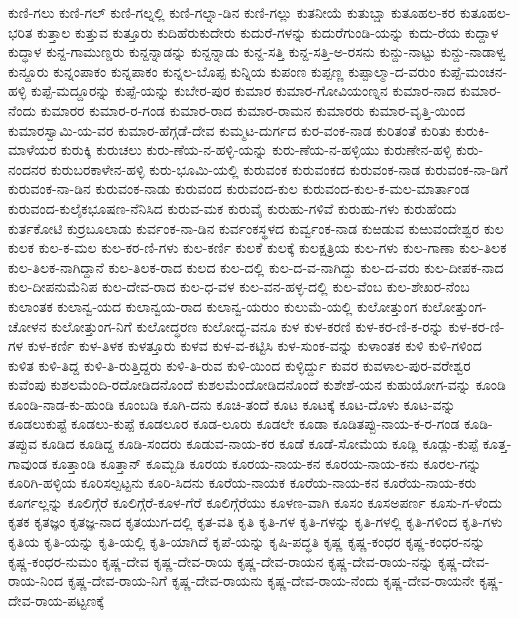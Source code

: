 {ಕುಣಿ-ಗಲು
ಕುಣಿ-ಗಲ್
ಕುಣಿ-ಗಲ್ನಲ್ಲಿ
ಕುಣಿ-ಗಲ್ನಾ-ಡಿನ
ಕುಣಿ-ಗಲ್ಲು
ಕುತನೀಯೆ
ಕುತುಬ್ಷಾ
ಕುತೂಹಲ-ಕರ
ಕುತೂಹಲ-ಭರಿತ
ಕುತ್ತಾಲ
ಕುತ್ತುವ
ಕುತ್ತೂರು
ಕುದಿಹೆರುಕುದೇರು
ಕುದುರೆ-ಗಳನ್ನು
ಕುದುರೆಗುಂಡಿ-ಯನ್ನು
ಕುದು-ರೆಯ
ಕುದ್ದಾಳ
ಕುದ್ಧಾಳ
ಕುನ್ದ-ಗಾಮುಣ್ಡರು
ಕುನ್ದನ್ನಾಡನ್ನು
ಕುನ್ದನ್ನಾಡು
ಕುನ್ದ-ಸತ್ತಿ
ಕುನ್ದ-ಸತ್ತಿ-ಅ-ರಸನು
ಕುನ್ದು-ನಾಟ್ಟು
ಕುನ್ದು-ನಾಡಾಳ್ವ
ಕುನ್ದೂರು
ಕುನ್ನಂಪಾಕಂ
ಕುನ್ನಪಾಕಂ
ಕುನ್ನಲ-ಬೊಪ್ಪ
ಕುನ್ನಿಯ
ಕುಪಂಣ
ಕುಪ್ಪಣ್ಣ
ಕುಪ್ಪಾಲ್ಮಾ-ದ-ವರುಂ
ಕುಪ್ಪೆ-ಮಂಚನ-ಹಳ್ಳಿ
ಕುಪ್ಪೆ-ಮದ್ದೂರನ್ನು
ಕುಪ್ಪೆ-ಯನ್ನು
ಕುಬೇರ-ಪುರ
ಕುಮಾರ
ಕುಮಾರ-ಗೋವಿಯಂಣ್ನನ
ಕುಮಾರ-ನಾದ
ಕುಮಾರ-ನೆಂದು
ಕುಮಾರರ
ಕುಮಾರ-ರ-ಗಂಡ
ಕುಮಾರ-ರಾದ
ಕುಮಾರ-ರಾಮನ
ಕುಮಾರರು
ಕುಮಾರ-ವೃತ್ತಿ-ಯಿಂದ
ಕುಮಾರಸ್ವಾಮಿ-ಯ-ವರ
ಕುಮಾರ-ಹೆಗ್ಗಡೆ-ದೇವ
ಕುಮ್ಮಟ-ದುರ್ಗದ
ಕುರ-ವಂಕ-ನಾಡ
ಕುರಿತಂತೆ
ಕುರಿತು
ಕುರುಕಿ-ಮಾಳೆಯರ
ಕುರುಕ್ಕಿ
ಕುರುಚಲು
ಕುರು-ಣೆಯ-ನ-ಹಳ್ಳಿ-ಯನ್ನು
ಕುರು-ಣೆಯ-ನ-ಹಳ್ಳಿಯು
ಕುರುಣೇನ-ಹಳ್ಳಿ
ಕುರು-ನಂದನರ
ಕುರುಬರಕಾಳೇನ-ಹಳ್ಳಿ
ಕುರು-ಭೂಮಿ-ಯಲ್ಲಿ
ಕುರುವಂಕ
ಕುರುವಂಕದ
ಕುರುವಂಕ-ನಾಡ
ಕುರುವಂಕ-ನಾ-ಡಿಗೆ
ಕುರುವಂಕ-ನಾ-ಡಿನ
ಕುರುವಂಕ-ನಾಡು
ಕುರುವಂದ
ಕುರುವಂದ-ಕುಲ
ಕುರುವಂದ-ಕುಲ-ಕ-ಮಲ-ಮಾರ್ತಾಂಡ
ಕುರುವಂದ-ಕುಲೈಕಭೂಷಣ-ನೆನಿಸಿದ
ಕುರುವ-ಮಕ
ಕುರುವೈ
ಕುರುಹು-ಗಳಿವೆ
ಕುರುಹು-ಗಳು
ಕುರುಹೆಂದು
ಕುರ್ತಕೋಟಿ
ಕುರ್ರಬೂಲಾಡು
ಕುರ್ವಂಕ-ನಾ-ಡಿನ
ಕುರ್ವಂಕಸ್ಥಳದ
ಕುರ್ವ್ವಂಕ-ನಾಡ
ಕುಱಡುವ
ಕುಱುವಂದೇಶ್ವರ
ಕುಲ
ಕುಲಕ
ಕುಲ-ಕ-ಮಲ
ಕುಲ-ಕರ-ಣಿ-ಗಳು
ಕುಲ-ಕರ್ಣಿ
ಕುಲಕೆ
ಕುಲಕ್ಕೆ
ಕುಲಕ್ಷತ್ರಿಯ
ಕುಲ-ಗಳು
ಕುಲ-ಗಾಣಾ
ಕುಲ-ತಿಲಕ
ಕುಲ-ತಿಲಕ-ನಾಗಿದ್ದಾನೆ
ಕುಲ-ತಿಲಕ-ರಾದ
ಕುಲದ
ಕುಲ-ದಲ್ಲಿ
ಕುಲ-ದ-ವ-ನಾಗಿದ್ದು
ಕುಲ-ದ-ವರು
ಕುಲ-ದೀಪಕ-ನಾದ
ಕುಲ-ದೀಪನುಮೆನಿಪ
ಕುಲ-ದೇವ-ರಾದ
ಕುಲ-ಧ-ವಳ
ಕುಲ-ವನ-ಹಳ್ಳ-ದಲ್ಲಿ
ಕುಲ-ವೆಂಬ
ಕುಲ-ಶೇಖರ-ನೆಂಬ
ಕುಲಾಂತಕ
ಕುಲಾನ್ವ-ಯದ
ಕುಲಾನ್ವಯ-ರಾದ
ಕುಲಾನ್ವ-ಯರುಂ
ಕುಲುಮೆ-ಯಲ್ಲಿ
ಕುಲೋತ್ತುಂಗ
ಕುಲೋತ್ತುಂಗ-ಚೋಳನ
ಕುಲೋತ್ತುಂಗ-ನಿಗೆ
ಕುಲೋದ್ಧರಣ
ಕುಲೋದ್ಭ-ವನೂ
ಕುಳ
ಕುಳ-ಕರಣಿ
ಕುಳ-ಕರ-ಣಿ-ಕ-ರನ್ನು
ಕುಳ-ಕರ-ಣಿ-ಗಳ
ಕುಳ-ಕರ್ಣಿ
ಕುಳ-ತಿಳಕ
ಕುಳತ್ತೂರು
ಕುಳವ
ಕುಳ-ವ-ಕಟ್ಟಿಸಿ
ಕುಳ-ಸುಂಕ-ವನ್ನು
ಕುಳಾಂತಕ
ಕುಳಿ
ಕುಳಿ-ಗಳಿಂದ
ಕುಳಿತ
ಕುಳಿ-ತಿದ್ದ
ಕುಳಿ-ತಿ-ರುತ್ತಿದ್ದರು
ಕುಳಿ-ತಿ-ರುವ
ಕುಳಿ-ಯಿಂದ
ಕುಳ್ಳಿರ್ದ್ದು
ಕುವರ
ಕುವಳಾಲ-ಪುರ-ವರೇಶ್ವರ
ಕುವೆಂಪು
ಕುಶಲಮೆಂದಿ-ರದೋಡಿದನೊಂದೆ
ಕುಶಲಮೆಂದೋಡಿದನೊಂದೆ
ಕುಶೇಶೆ-ಯನ
ಕುಹುಯೋಗ-ವನ್ನು
ಕೂಂಡಿ
ಕೂಂಡಿ-ನಾಡ-ಕು-ಹುಂಡಿ
ಕೂಂಬಡಿ
ಕೂಗಿ-ದನು
ಕೂಚಿ-ತಂದೆ
ಕೂಟ
ಕೂಟಕ್ಕೆ
ಕೂಟ-ದೊಳು
ಕೂಟ-ವನ್ನು
ಕೂಡಲುಕುಪ್ಟೆ
ಕೂಡಲು-ಕುಪ್ಪೆ
ಕೂಡಲೂರ
ಕೂಡ-ಲೂರು
ಕೂಡಲೇ
ಕೂಡಾ
ಕೂಡಿತಪ್ಪು-ನಾಯ-ಕ-ರ-ಗಂಡ
ಕೂಡಿ-ತಪ್ಪುವ
ಕೂಡಿದ
ಕೂಡಿದ್ದ
ಕೂಡಿ-ಸಂದರು
ಕೂಡುವ-ನಾಯ-ಕರ
ಕೂಡೆ
ಕೂಡೆ-ಸೋಮೆಯ
ಕೂಡ್ಲಿ
ಕೂಡ್ಲು-ಕುಪ್ಪೆ
ಕೂತ್ತ-ಗಾವುಂಡ
ಕೂತ್ತಾಂಡಿ
ಕೂತ್ತಾನ್
ಕೂಮ್ಬಡಿ
ಕೂರಯ
ಕೂರಯ-ನಾಯ-ಕನ
ಕೂರಯ-ನಾಯ-ಕನು
ಕೂರಲ-ಗನ್ನು
ಕೂರಿಗಿ-ಹಳ್ಳಿಯ
ಕೂರಿಸಲ್ಪಟ್ಟನು
ಕೂರಿ-ಸಿದನು
ಕೂರೆಯ-ನಾಯಕ
ಕೂರೆಯ-ನಾಯ-ಕನ
ಕೂರೆಯ-ನಾಯ-ಕರು
ಕೂರ್ಗಲ್ಲನ್ನು
ಕೂಲಿಗ್ಗೆರೆ
ಕೂಲಿಗ್ಗೆರೆ-ಕೂಳ-ಗೆರೆ
ಕೂಲಿಗ್ಗೆರೆಯು
ಕೂಳಣ-ವಾಗಿ
ಕೂಸಂ
ಕೂಸಅಪರ್ಣ
ಕೂಸು-ಗ-ಳೆಂದು
ಕೃತಕ
ಕೃತಜ್ಞಂ
ಕೃತಜ್ಞ-ನಾದ
ಕೃತಯುಗ-ದಲ್ಲಿ
ಕೃತ-ವತಿ
ಕೃತಿ
ಕೃತಿ-ಗಳ
ಕೃತಿ-ಗಳನ್ನು
ಕೃತಿ-ಗಳಲ್ಲಿ
ಕೃತಿ-ಗಳಿಂದ
ಕೃತಿ-ಗಳು
ಕೃತಿಯ
ಕೃತಿ-ಯನ್ನು
ಕೃತಿ-ಯಲ್ಲಿ
ಕೃತಿ-ಯಾಗಿದೆ
ಕೃಪೆ-ಯನ್ನು
ಕೃಷಿ-ಪದ್ಧತಿ
ಕೃಷ್ಣ
ಕೃಷ್ಣ-ಕಂಧರ
ಕೃಷ್ಣ-ಕಂಧರ-ನನ್ನು
ಕೃಷ್ಣ-ಕಂಧರ-ನುಮಂ
ಕೃಷ್ಣ-ದೇವ
ಕೃಷ್ಣ-ದೇವ-ರಾಯ
ಕೃಷ್ಣ-ದೇವ-ರಾಯನ
ಕೃಷ್ಣ-ದೇವ-ರಾಯ-ನನ್ನು
ಕೃಷ್ಣ-ದೇವ-ರಾಯ-ನಿಂದ
ಕೃಷ್ಣ-ದೇವ-ರಾಯ-ನಿಗೆ
ಕೃಷ್ಣ-ದೇವ-ರಾಯನು
ಕೃಷ್ಣ-ದೇವ-ರಾಯ-ನೆಂದು
ಕೃಷ್ಣ-ದೇವ-ರಾಯನೇ
ಕೃಷ್ಣ-ದೇವ-ರಾಯ-ಪಟ್ಟಣಕ್ಕೆ
}
